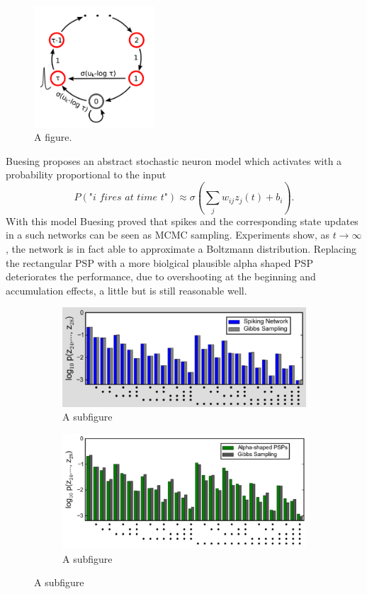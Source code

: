 \begin{figure}
	\centering
    	\includegraphics[width=0.4\textwidth]{imgs/snn_sample2.png} 
    \caption{A figure.}
	\label{fig:test}
\end{figure}

Buesing proposes an abstract stochastic neuron model which activates with a probability proportional to the input
\[
P(\textit{"i fires at time t"}) \approx \sigma(\sum_j w_{ij} z_j(t) + b_i).
\]
With this model Buesing proved that spikes and the corresponding state updates in a such networks can be seen as MCMC sampling. Experiments show, as $t \rightarrow \infty$ , the network is in fact able to approximate a Boltzmann distribution.
Replacing the rectangular PSP with a more biolgical plausible alpha shaped PSP deteriorates the performance, due to overshooting at the beginning and accumulation effects, a little but is still reasonable well.

\begin{figure}
	\centering
	\begin{subfigure}[t]{.50\textwidth}
  		\centering
  		\includegraphics[width=.8\linewidth]{imgs/snn_sample3.png}
  		\caption{A subfigure}
  		\label{fig:sub1}
	\end{subfigure}%
	\begin{subfigure}[t]{.50\textwidth}
  		\centering
  		\includegraphics[width=.8\linewidth]{imgs/snn_sample4.png}
  		\caption{A subfigure}
  		\label{fig:sub2}
	\end{subfigure}
\end{figure}

